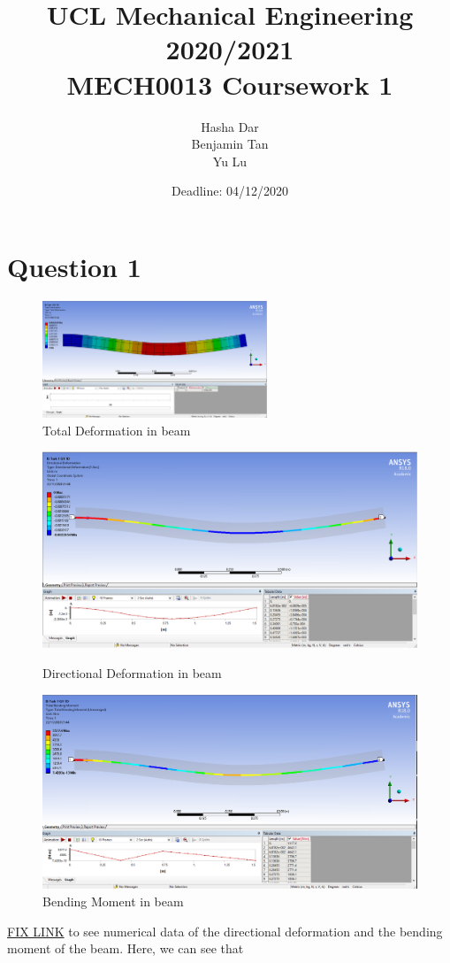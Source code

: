 \documentclass[11pt]{article}
\numberwithin{equation}{section}
\begin{document}
\title{\textbf{UCL Mechanical Engineering 2020/2021}\\MECH0013 Coursework 1}
\date{Deadline: 04/12/2020}
\author{Hasha Dar\\
Benjamin Tan\\
Yu Lu}
\maketitle
\tableofcontents
\newpage
\section{Question 1}
\begin{figure}[H]
  \centering
  \includegraphics[width = 0.6\textwidth]{./img/TotalDeformationQ1.png}
  \caption{Total Deformation in beam}
\end{figure}
\begin{figure}[H]
  \centering
  \begin{minipage}[b]{0.49\textwidth}
    \includegraphics[width=\textwidth]{./img/DirectionalDeformationQ1.png}
    \caption{Directional Deformation in beam}
  \end{minipage}
  \hfill
  \begin{minipage}[b]{0.49\textwidth}
    \includegraphics[width=\textwidth]{./img/BendingMomentQ1.png}
    \caption{Bending Moment in beam}
  \end{minipage}
\end{figure}
\href{https://github.com/hashadar/ME-Latex/tree/master/MECH0013/Topic%20Notes}{FIX LINK} to see numerical data of the directional deformation and the bending moment of the beam. Here, we can see that 
\end{document}
